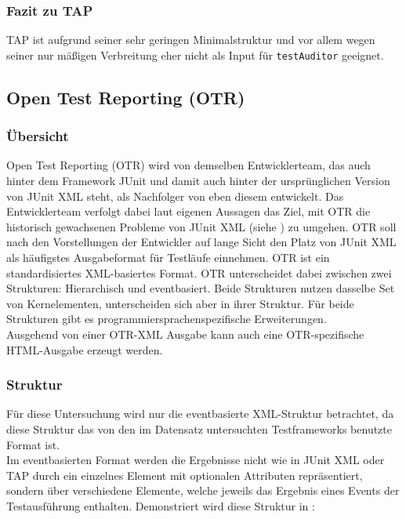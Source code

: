 \subsubsection{Fazit zu TAP}
TAP ist aufgrund seiner sehr geringen Minimalstruktur und vor allem wegen seiner nur mäßigen Verbreitung eher nicht als Input für \texttt{testAuditor} geeignet. 

\subsection{Open Test Reporting (OTR)}
\subsubsection{Übersicht}
Open Test Reporting (OTR) wird von demselben Entwicklerteam, das auch hinter dem Framework JUnit und damit auch hinter der ursprünglichen Version von JUnit XML steht, als Nachfolger von eben diesem entwickelt. Das Entwicklerteam verfolgt dabei laut eigenen Aussagen das Ziel, mit OTR die historisch gewachsenen Probleme von JUnit XML (siehe ) zu umgehen. OTR soll nach den Vorstellungen der Entwickler auf lange Sicht den Platz von JUnit XML als häufigstes Ausgabeformat für Testläufe einnehmen. \cite{OTR_milestone}
\newpage
OTR ist ein standardisiertes XML-basiertes Format. OTR unterscheidet dabei zwischen zwei Strukturen: Hierarchisch und eventbasiert. Beide Strukturen nutzen dasselbe Set von Kernelementen, unterscheiden sich aber in ihrer Struktur. Für beide Strukturen gibt es programmiersprachenspezifische Erweiterungen.\\
Ausgehend von einer OTR-XML Ausgabe kann auch eine OTR-spezifische HTML-Ausgabe erzeugt werden.

\subsubsection{Struktur}
Für diese Untersuchung wird nur die eventbasierte XML-Struktur betrachtet, da diese Struktur das von den im Datensatz untersuchten Testframeworks benutzte Format ist.\\
Im eventbasierten Format werden die Ergebnisse nicht wie in JUnit XML oder TAP durch ein einzelnes Element mit optionalen Attributen repräsentiert, sondern über verschiedene Elemente, welche jeweils das Ergebnis eines Events der Testausführung enthalten. Demonstriert wird diese Struktur in :

